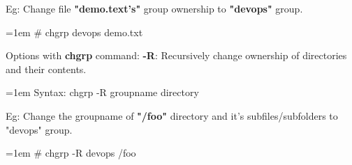 \begin{flushleft}
Eg: Change file \textbf{"demo.text's"} group ownership to \textbf{"devops"} group.
\begin{tcolorbox}[breakable,notitle,boxrule=-0pt,colback=black,colframe=black]
		\color{green}
		\font=1em
		\# chgrp devops demo.txt
		\font=4pt
\end{tcolorbox}
	
Options with \textbf{chgrp} command:	
\newline
\textbf{-R}: Recursively change ownership of directories and their contents.
\begin{tcolorbox}[breakable,notitle,boxrule=0pt,colback=pink,colframe=pink]
	\color{black}
	\font=1em
	Syntax: chgrp -R groupname directory
	\font=4pt
\end{tcolorbox}
Eg: Change the groupname of \textbf{"/foo"} directory and it's subfiles/subfolders to "devops" group.
\begin{tcolorbox}[breakable,notitle,boxrule=-0pt,colback=black,colframe=black]
	\color{green}
	\font=1em
	\# chgrp -R devops /foo
	\font=4pt
\end{tcolorbox}


	
\end{flushleft}

\newpage

